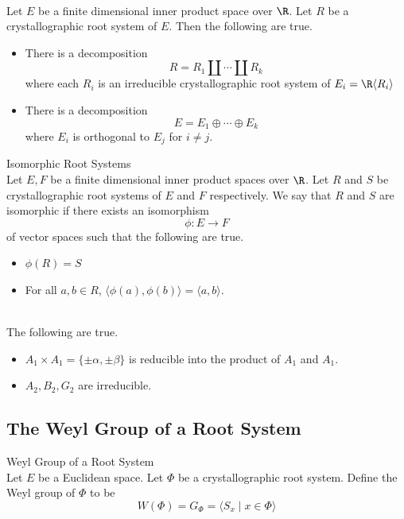 \documentclass[a4paper]{article}
\begin{document}
\begin{prp}{}{}\\
Let $E$ be a finite dimensional inner product space over $\R$. Let $R$ be a crystallographic root system of $E$. Then the following are true. 
\begin{itemize}
\item There is a decomposition $$R=R_1\amalg\cdots\amalg R_k$$ where each $R_i$ is an irreducible crystallographic root system of $E_i=\R\langle R_i\rangle$
\item There is a decomposition $$E=E_1\oplus\cdots\oplus E_k$$ where $E_i$ is orthogonal to $E_j$ for $i\neq j$. 
\end{itemize}
\end{prp}

\begin{defn}{Isomorphic Root Systems}{} \\Let $E,F$ be a finite dimensional inner product spaces over $\R$. Let $R$ and $S$ be crystallographic root systems of $E$ and $F$ respectively. We say that $R$ and $S$ are isomorphic if there exists an isomorphism $$\phi:E\to F$$ of vector spaces such that the following are true. 
\begin{itemize}
\item $\phi(R)=S$
\item For all $a,b\in R$, $\langle\phi(a),\phi(b)\rangle=\langle a,b\rangle$. 
\end{itemize}
\end{defn}

\begin{eg}{}{} \\The following are true. 
\begin{itemize}
\item $A_1\times A_1=\{\pm\alpha,\pm\beta\}$ is reducible into the product of $A_1$ and $A_1$. 
\item $A_2,B_2,G_2$ are irreducible. 
\end{itemize}
\end{eg}

\subsection{The Weyl Group of a Root System}
\begin{defn}{Weyl Group of a Root System}{}\\
Let $E$ be a Euclidean space. Let $\Phi$ be a crystallographic root system. Define the Weyl group of $\Phi$ to be $$W(\Phi)=G_\Phi=\langle S_x\;|\;x\in\Phi\rangle$$
\end{defn}
\end{document}
